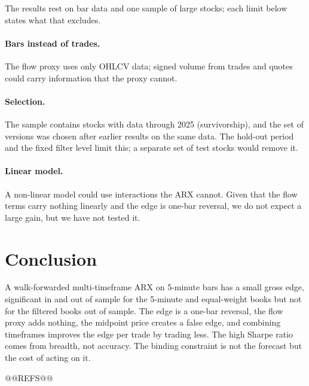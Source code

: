 \documentclass[11pt,a4paper]{article}
\begin{document}
The results rest on bar data and one sample of large stocks; each limit below states what that excludes.


\paragraph{Bars instead of trades.} The flow proxy uses only OHLCV data; signed volume from trades and
quotes \citep{lee1991} could carry information that the proxy cannot.

\paragraph{Selection.} The sample contains stocks with data through 2025 (survivorship), and the set of
versions was chosen after earlier results on the same data. The hold-out period and the fixed filter
level limit this; a separate set of test stocks would remove it.

\paragraph{Linear model.} A non-linear model could use interactions the ARX cannot. Given that the flow
terms carry nothing linearly and the edge is one-bar reversal, we do not expect a large gain, but we have
not tested it.

\section{Conclusion}

A walk-forwarded multi-timeframe ARX on 5-minute bars has a small gross edge, significant in and out of sample for
the 5-minute and equal-weight books but not for the filtered books out of sample. The edge
is a one-bar reversal, the flow proxy adds nothing, the midpoint price creates a false edge, and combining
timeframes improves the edge per trade by trading less. The high Sharpe ratio comes from breadth, not
accuracy. The binding constraint is not the forecast but the cost of acting on it.

@@REFS@@
\end{document}
